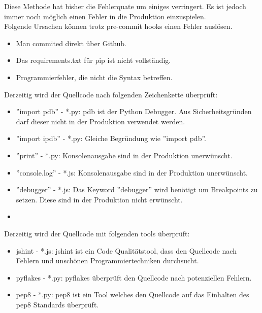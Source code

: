 Diese Methode hat bisher die Fehlerquate um einiges verringert. Es ist jedoch immer noch möglich einen Fehler in die Produktion einzuspielen. \\  
Folgende Ursachen können trotz pre-commit hooks einen Fehler auslösen. 
\begin{itemize}
    \item Man commited direkt über Github.
    \item Das requirements.txt für pip ist nicht vollständig.
    \item Programmierfehler, die nicht die Syntax betreffen. 
\end{itemize}
Derzeitig wird der Quellcode nach folgenden Zeichenkette überprüft:
\begin{itemize}
    \item ''import pdb'' - *.py: 
        pdb ist der Python Debugger. Aus Sicherheitsgründen darf dieser nicht in der Produktion verwendet werden.
    \item ''import ipdb'' - *.py:
        Gleiche Begründung wie ''import pdb''.
    \item ''print'' - *.py:
        Konsolenausgabe sind in der Produktion unerwünscht.
    \item ''console.log'' - *.js:
        Konsolenausgabe sind in der Produktion unerwünscht.
    \item ''debugger'' - *.js:
        Das Keyword ''debugger'' wird benötigt um Breakpoints zu setzen. Diese sind in der Produktion nicht erwünscht.
    \item 
\end{itemize}
Derzeitig wird der Quellcode mit folgenden tools überprüft:
\begin{itemize}
    \item jshint - *.js:
        jshint ist ein Code Qualitätstool, dass den Quellcode nach Fehlern und unschönen Programmiertechniken durchsucht.
    \item pyflakes - *.py:
        pyflakes überprüft den Quellcode nach potenziellen Fehlern.
    \item pep8 - *.py:
        pep8 ist ein Tool welches den Quellcode auf das Einhalten des pep8 Standards überprüft.
\end{itemize}

